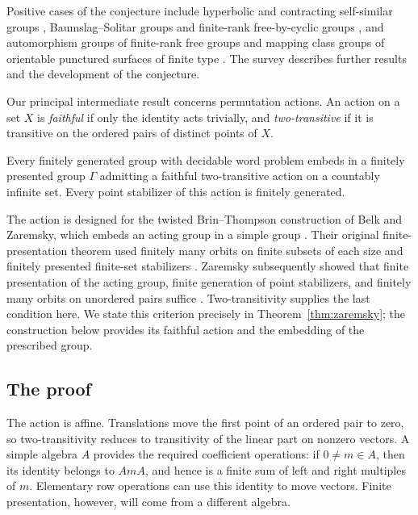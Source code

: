 Positive cases of the conjecture include hyperbolic and contracting
self-similar groups \cite[Theorem~A and Corollary~D]{BBMZhyperbolic},
Baumslag--Solitar groups and finite-rank free-by-cyclic groups
\cite[Theorem~A]{BuxLlosaWu2025}, and automorphism groups of finite-rank
free groups and mapping class groups of orientable punctured surfaces
of finite type \cite[Theorem~A and Corollary~B]{BFFHZ}.
The survey \cite{BBMZsurvey} describes further results and the
development of the conjecture.

Our principal intermediate result concerns permutation actions.
An action on a set \(X\) is \emph{faithful} if only the identity acts
trivially, and \emph{two-transitive} if it is transitive on the ordered
pairs of distinct points of \(X\).

\begin{theorem}\label{thm:envelope}
Every finitely generated group with decidable word problem embeds in a
finitely presented group \(\Gamma\) admitting a faithful two-transitive
action on a countably infinite set. Every point stabilizer of this action
is finitely generated.
\end{theorem}

The action is designed for the twisted Brin--Thompson construction of
Belk and Zaremsky, which embeds an acting group in a simple group
\cite[Section~3 and Theorem~3.4]{BelkZaremsky2022}.
Their original finite-presentation theorem used finitely many orbits on
finite subsets of each size and finitely presented finite-set
stabilizers \cite[Theorem~D]{BelkZaremsky2022}.
Zaremsky subsequently showed that finite presentation of the acting
group, finite generation of point stabilizers, and finitely many orbits
on unordered pairs suffice
\cite[Theorem~A and Corollary~B]{Zaremsky2024Finite}.
Two-transitivity supplies the last condition here. We state this
criterion precisely in Theorem~\ref{thm:zaremsky}; the construction below
provides its faithful action and the embedding of the prescribed group.

\subsection*{The proof}

The action is affine. Translations move the first point of an ordered
pair to zero, so two-transitivity reduces to transitivity of the linear
part on nonzero vectors. A simple algebra \(A\) provides the required
coefficient operations: if \(0\ne m\in A\), then its identity belongs
to \(AmA\), and hence is a finite sum of left and right multiples of
\(m\). Elementary row operations can use this identity to move vectors.
Finite presentation, however, will come from a different algebra.

